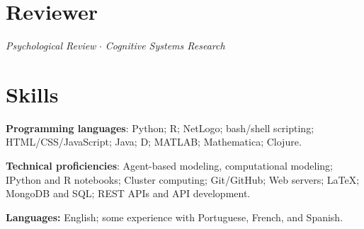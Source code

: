 \documentclass[letterpaper,11pt,oneside]{article}
\begin{document}

\noindent
\section*{\textcolor{gunmetal}{Reviewer}}

  \begin{hangparas}{0.25in}{1}
    \emph{Psychological Review} $\cdot$ \emph{Cognitive Systems Research}
  \end{hangparas}


\noindent
\section*{\textcolor{gunmetal}{Skills}}

\begin{hangparas}{0.25in}{1}
  \textbf{Programming languages}: Python; R; NetLogo; bash/shell scripting; 
  HTML/CSS/JavaScript; Java; D; MATLAB; Mathematica; Clojure.

  \textbf{Technical proficiencies}: Agent-based modeling, computational 
  modeling; IPython and R notebooks; Cluster computing;
  Git/GitHub; Web servers; \LaTeX; MongoDB and SQL; REST APIs and API
  development.

  \textbf{Languages:} English; some experience with Portuguese, French,
  and Spanish.
\end{hangparas}
\end{document}
